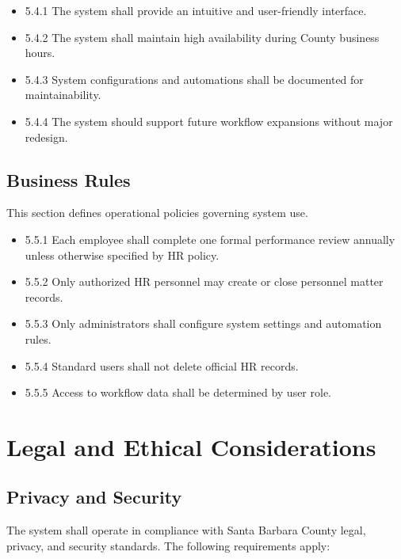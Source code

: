 \documentclass[12pt]{article}
\begin{document}
\begin{itemize}
    \item 5.4.1 The system shall provide an intuitive and user-friendly interface.
    \item 5.4.2 The system shall maintain high availability during County business hours.
    \item 5.4.3 System configurations and automations shall be documented for maintainability.
    \item 5.4.4 The system should support future workflow expansions without major redesign.
\end{itemize}


\subsection{Business Rules}

This section defines operational policies governing system use.

\begin{itemize}
    \item 5.5.1 Each employee shall complete one formal performance review annually unless otherwise specified by HR policy.
    \item 5.5.2 Only authorized HR personnel may create or close personnel matter records.
    \item 5.5.3 Only administrators shall configure system settings and automation rules.
    \item 5.5.4 Standard users shall not delete official HR records.
    \item 5.5.5 Access to workflow data shall be determined by user role.
\end{itemize}


\section{Legal and Ethical Considerations}

\subsection{Privacy and Security}

The system shall operate in compliance with Santa Barbara County legal, privacy, and security standards. The following requirements apply:
\end{document}
